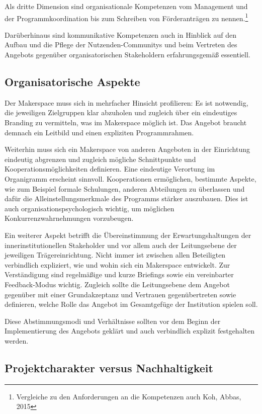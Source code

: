 \documentclass[a4paper,
fontsize=11pt,
oneside,
numbers=noperiodatend,
parskip=half-,
bibliography=totoc,
final
]{scrartcl}
\begin{document}
Als dritte Dimension sind organisationale Kompetenzen vom Management und
der Programmkoordination bis zum Schreiben von Förderanträgen zu
nennen.\footnote{Vergleiche zu den Anforderungen an die Kompetenzen auch
  Koh, Abbas, 2015}

Darüberhinaus sind kommunikative Kompetenzen auch in Hinblick auf den
Aufbau und die Pflege der Nutzenden-Communitys und beim Vertreten des
Angebots gegenüber organisatorischen Stakeholdern erfahrungsgemäß
essentiell.

\hypertarget{organisatorische-aspekte}{%
\subsection{Organisatorische Aspekte}\label{organisatorische-aspekte}}

Der Makerspace muss sich in mehrfacher Hinsicht profilieren: Es ist
notwendig, die jeweiligen Zielgruppen klar abzuholen und zugleich über
ein eindeutiges Branding zu vermitteln, was im Makerspace möglich ist.
Das Angebot braucht demnach ein Leitbild und einen expliziten
Programmrahmen.

Weiterhin muss sich ein Makerspace von anderen Angeboten in der
Einrichtung eindeutig abgrenzen und zugleich mögliche Schnittpunkte und
Kooperationsmöglichkeiten definieren. Eine eindeutige Verortung im
Organigramm erscheint sinnvoll. Kooperationen ermöglichen, bestimmte
Aspekte, wie zum Beispiel formale Schulungen, anderen Abteilungen zu
überlassen und dafür die Alleinstellungsmerkmale des Programms stärker
auszubauen. Dies ist auch organisationspsychologisch wichtig, um
möglichen Konkurrenzwahrnehmungen vorzubeugen.

Ein weiterer Aspekt betrifft die Übereinstimmung der Erwartungshaltungen
der innerinstitutionellen Stakeholder und vor allem auch der
Leitungsebene der jeweiligen Trägereinrichtung. Nicht immer ist zwischen
allen Beteiligten verbindlich expliziert, wie und wohin sich ein
Makerspace entwickelt. Zur Verständigung sind regelmäßige und kurze
Briefings sowie ein vereinbarter Feedback-Modus wichtig. Zugleich sollte
die Leitungsebene dem Angebot gegenüber mit einer Grundakzeptanz und
Vertrauen gegenübertreten sowie definieren, welche Rolle das Angebot im
Gesamtgefüge der Institution spielen soll.

Diese Abstimmungsmodi und Verhältnisse sollten vor dem Beginn der
Implementierung des Angebots geklärt und auch verbindlich explizit
festgehalten werden.

\hypertarget{projektcharakter-versus-nachhaltigkeit}{%
\subsection{Projektcharakter versus
Nachhaltigkeit}\label{projektcharakter-versus-nachhaltigkeit}}
\end{document}
